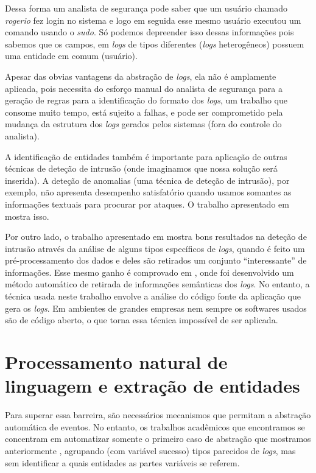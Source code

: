\documentclass[
	12pt,				%
	openright,			%
	twoside,			%
	a4paper,			%
	english,			%
	spanish,			%
	brazil,				%
	]{abntex2}
\begin{document}
Dessa forma um analista de segurança pode saber que um usuário chamado \emph{rogerio} fez login no sistema e logo em seguida esse mesmo usuário executou um comando usando o \emph{sudo}. Só podemos depreender isso dessas informações pois sabemos que os campos, em \emph{logs} de tipos diferentes (\emph{logs} heterogêneos) possuem uma entidade em comum (usuário).

Apesar das obvias vantagens da abstração de \emph{logs}, ela não é amplamente aplicada, pois necessita do esforço manual do analista de segurança para a geração de regras para a identificação do formato dos \emph{logs}, um trabalho que consome muito tempo, está sujeito a falhas, e pode ser comprometido pela mudança da estrutura dos \emph{logs} gerados pelos sistemas (fora do controle do analista).

A identificação de entidades também é importante para aplicação de outras técnicas de deteção de intrusão (onde imaginamos que nossa solução será inserida). A deteção de anomalias (uma técnica de deteção de intrusão), por exemplo, não apresenta desempenho satisfatório quando usamos somantes as informações textuais para procurar por ataques. O trabalho apresentado em \cite{li2013automatic} mostra isso.

Por outro lado, o trabalho apresentado em \cite{yen2013beehive} mostra bons resultados na deteção de intrusão através da análise de alguns tipos específicos de \emph{logs}, quando é feito um pré-processamento dos dados e deles são retirados um conjunto ``interessante'' de informações. Esse mesmo ganho é comprovado em \cite{xu2009detecting}, onde foi desenvolvido um método automático de retirada de informações semânticas dos \emph{logs}. No entanto, a técnica usada neste trabalho envolve a análise do código fonte da aplicação que gera os \emph{logs}. Em ambientes de grandes empresas nem sempre os softwares usados são de código aberto, o que torna essa técnica impossível de ser aplicada.

\section{Processamento natural de linguagem e extração de entidades}
Para superar essa barreira, são necessários mecanismos que permitam a abstração automática de eventos. No entanto, os trabalhos acadêmicos que encontramos se concentram em automatizar somente o primeiro caso de abstração que mostramos anteriormente \cite{vaarandi2003data, nagappan2010abstracting}, agrupando (com variável sucesso) tipos parecidos de \emph{logs}, mas sem identificar a quais entidades as partes variáveis se referem.
\end{document}
